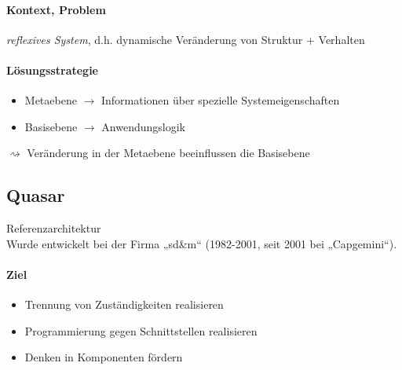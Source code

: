 \documentclass{scrreprt}
\begin{document}
\paragraph{Kontext, Problem} \emph{reflexives System}, d.h. dynamische Veränderung von Struktur + Verhalten
\paragraph{Lösungsstrategie}
\begin{itemize}
\item Metaebene $\rightarrow$ Informationen über spezielle Systemeigenschaften
\item Basisebene $\rightarrow$ Anwendungslogik
\end{itemize}
$\rightsquigarrow$ Veränderung in der Metaebene beeinflussen die Basisebene

\subsection{Quasar}
Referenzarchitektur\\
Wurde entwickelt bei der Firma „sd\&m“ (1982-2001, seit 2001 bei „Capgemini“).
\paragraph{Ziel}
\begin{itemize}
\item Trennung von Zuständigkeiten realisieren
\item Programmierung gegen Schnittstellen realisieren
\item Denken in Komponenten fördern
\end{itemize}
\end{document}
